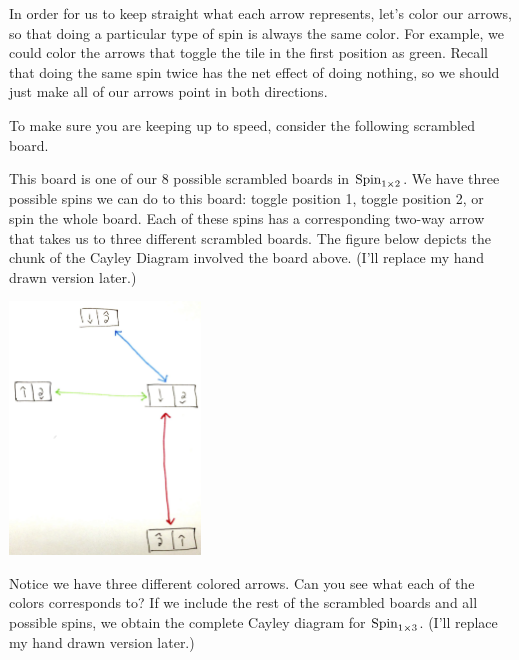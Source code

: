 In order for us to keep straight what each arrow represents, let's color our arrows, so that doing a particular type of spin is always the same color.  For example, we could color the arrows that toggle the tile in the first position as green.  Recall that doing the same spin twice has the net effect of doing nothing, so we should just make all of our arrows point in both directions.

To make sure you are keeping up to speed, consider the following scrambled board.

\begin{center}
\end{center}

This board is one of our 8 possible scrambled boards in $\operatorname{Spin}_{1\times 2}$.  We have three possible spins we can do to this board: toggle position 1, toggle position 2, or spin the whole board.  Each of these spins has a corresponding two-way arrow that takes us to three different scrambled boards.  The figure below depicts the chunk of the Cayley Diagram involved the board above.  (I'll replace my hand drawn version later.)

\begin{center}
\includegraphics[width=2in]{chunk_cayley_spin1by2.png}
\end{center}

\noindent Notice we have three different colored arrows.  Can you see what each of the colors corresponds to?  If we include the rest of the scrambled boards and all possible spins, we obtain the complete Cayley diagram for $\operatorname{Spin}_{1\times 3}$.  (I'll replace my hand drawn version later.)

